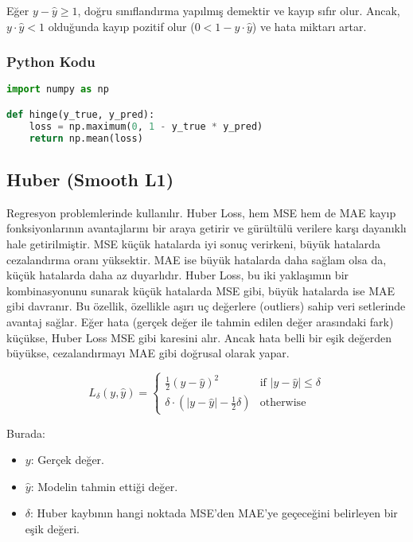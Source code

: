 Eğer $y - \hat{y} \geq 1$, doğru sınıflandırma yapılmış demektir ve kayıp sıfır olur. Ancak, $y \cdot \hat{y} < 1$ olduğunda kayıp pozitif olur ($0 < 1 - y \cdot \hat{y}$) ve hata miktarı artar.

\subsubsection{Python Kodu}

\begin{lstlisting}[language=Python]
import numpy as np

def hinge(y_true, y_pred):
    loss = np.maximum(0, 1 - y_true * y_pred)
    return np.mean(loss)
\end{lstlisting}

\newpage

\subsection{Huber (Smooth L1)}

Regresyon problemlerinde kullanılır. Huber Loss, hem MSE hem de MAE kayıp fonksiyonlarının avantajlarını bir araya getirir ve gürültülü verilere karşı dayanıklı hale getirilmiştir. MSE küçük hatalarda iyi sonuç verirkeni, büyük hatalarda cezalandırma oranı yüksektir. MAE ise büyük hatalarda daha sağlam olsa da, küçük hatalarda daha az duyarlıdır. Huber Loss, bu iki yaklaşımın bir kombinasyonunu sunarak küçük hatalarda MSE gibi, büyük hatalarda ise MAE gibi davranır. Bu özellik, özellikle aşırı uç değerlere (outliers) sahip veri setlerinde avantaj sağlar. Eğer hata (gerçek değer ile tahmin edilen değer arasındaki fark) küçükse, Huber Loss MSE gibi karesini alır. Ancak hata belli bir eşik değerden büyükse, cezalandırmayı MAE gibi doğrusal olarak yapar.

\[
L_{\delta}(y, \hat{y}) =
\begin{cases}
    \frac{1}{2} (y - \hat{y})^2 & \text{if } |y - \hat{y}| \leq \delta \\ 
    \delta \cdot (|y - \hat{y}| - \frac{1}{2} \delta) & \text{otherwise}
\end{cases}
\]

Burada:

\begin{itemize}
    \item $y$: Gerçek değer.
    \item $\hat{y}$: Modelin tahmin ettiği değer.
    \item $\delta$: Huber kaybının hangi noktada MSE'den MAE'ye geçeceğini belirleyen bir eşik değeri.
\end{itemize}

